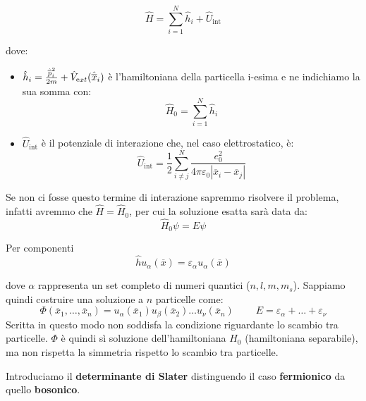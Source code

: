 \begin{equation*}
    \hat H = \sum_{i=1}^N \hat h_i + \hat U_{\text{int}}
\end{equation*}

\noindent dove:
\begin{itemize}
    \item $\hat h_i=\frac{{\hat{\overline{p}}}_i^2}{2m}+\hat V_{\text ext}(\hat{\overline{x}}_i)$ è l'hamiltoniana della particella i-esima e ne indichiamo la sua somma con:
    \begin{equation*}
        \hat H_0 = \sum_{i=1}^N \hat h_i
    \end{equation*}
    \item $\hat U_{\text{int}}$ è il potenziale di interazione che, nel caso elettrostatico, è: 
    \begin{equation*}
        \hat U_{\text{int}}=\frac 12 \sum_{i \neq j}^N\frac{e_0^2}{4\pi\varepsilon_0|\overline x_i - \overline x_j|}
    \end{equation*}
\end{itemize}

\noindent Se non ci fosse questo termine di interazione sapremmo risolvere il problema, infatti avremmo che $\hat H = \hat H_0$, per cui la soluzione esatta sarà data da:
\begin{equation*}
    \hat H_0\psi = E \psi 
\end{equation*}

\noindent Per componenti
\begin{equation*}
    \hat h u_\alpha(\overline x) = \varepsilon_\alpha u_\alpha(\overline x)
\end{equation*}

\noindent dove $\alpha$ rappresenta un set completo di numeri quantici ($n, l, m, m_s$). Sappiamo quindi costruire una soluzione a $n$ particelle come:
\begin{equation*}
    \Phi(\overline{x}_1, \dots, \overline{x}_n)=u_\alpha(\overline{x}_1)u_\beta(\overline{x}_2)\dots u_\nu(\overline{x}_n)
    \ \ \ \ \ \ \ \ \ \
    E = \varepsilon_\alpha + \dots + \varepsilon_\nu
\end{equation*}
\noindent Scritta in questo modo non soddisfa la condizione riguardante lo scambio tra particelle. $\Phi$ è quindi sì soluzione dell'hamiltoniana $H_0$ (hamiltoniana separabile), ma non rispetta la simmetria rispetto lo scambio tra particelle.

\noindent Introduciamo il \textbf{determinante di Slater} distinguendo il caso \textbf{fermionico} da quello \textbf{bosonico}.

